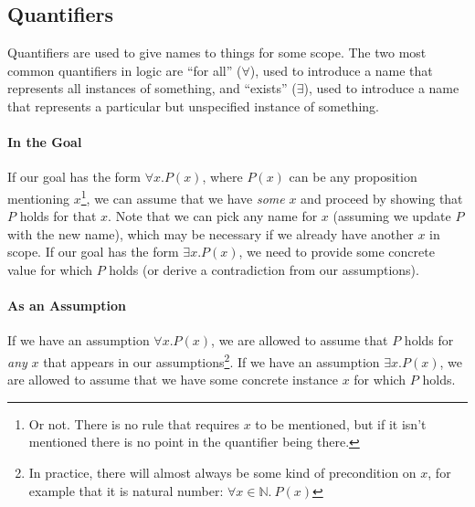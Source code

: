\documentclass{tufte-handout}
\newcounter{example}
\begin{document}
\subsection{Quantifiers}

Quantifiers are used to give names to things for some scope.
The two most common quantifiers in logic are ``for all''
($\forall$), used to introduce a name that represents all
instances of something, and ``exists'' ($\exists$), used to
introduce a name that represents a particular but unspecified
instance of something.

\paragraph{In the Goal}
If our goal has the form $\forall x. P(x)$, where $P(x)$ can be any
proposition mentioning $x$\footnote{Or not. There is no rule that
  requires $x$ to be mentioned, but if it isn't mentioned there is
  no point in the quantifier being there.}, we can assume that we
have \emph{some} $x$ and proceed by showing that $P$ holds for
that $x$. Note that we can pick any name for $x$ (assuming we
update $P$ with the new name), which may be necessary if we
already have another $x$ in scope.
%
If our goal has the form $\exists x. P(x)$, we need to provide
some concrete value for which $P$ holds (or derive a contradiction
from our assumptions).

\paragraph{As an Assumption}
If we have an assumption $\forall x. P(x)$, we are allowed to
assume that $P$ holds for \emph{any} $x$ that appears in our
assumptions\footnote{In practice, there will almost always be some
  kind of precondition on $x$, for example that it is natural
  number: $\forall x\in\mathbb{N}.~P(x)$}.
%
If we have an assumption $\exists x. P(x)$, we are allowed to
assume that we have some concrete instance $x$ for which $P$
holds.
\end{document}
